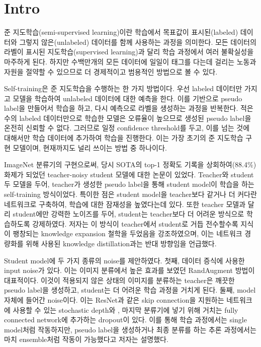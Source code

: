 \section{Intro}
준 지도학습(semi-supervised learning)이란 학습에서 목표값이 표시된(labeled) 데이터와 그렇지 않은(unlabeled) 데이터를 함께 사용하는 과정을 의미한다. 모든 데이터의 라벨이 표시된 지도학습(supervised learning)과 달리 학습 과정에서 여러 불확실성을 마주하게 된다. 하지만 수백만개의 모든 데이터에 일일이 태그를 다는데 걸리는 노동과 자원을 절약할 수 있으므로 더 경제적이고 범용적인 방법으로 볼 수 있다. \cite{zhu2006semisupervised}

Self-training은 준 지도학습을 수행하는 한 가지 방법이다. 우선 labeled 데이터만 가지고 모델을 학습하여 unlabeled 데이터에 대한 예측을 한다. 이를 기반으로 pseudo label을 만들어서 학습을 하고, 다시 예측으로 라벨을 생성하는 과정을 반복한다. 적은 수의 labeled 데이터만으로 학습한 모델은 오류율이 높으므로 생성된 pseudo label을 온전히 신뢰할 수 없다. 그러므로 일정 confidence threshold를 두고, 이를 넘는 것에 대해서만 학습 데이터에 추가하여 학습을 진행한다. 이는 가장 초기의 준 지도학습 구현 모델이며, 현재까지도 널리 쓰이는 방법 중 하나이다. \cite{zhu2006semisupervised}

ImageNet 분류기의 구현으로써, 당시 SOTA의 top-1 정확도 기록을 상회하여(88.4\%) 화제가 되었던 teacher-noisy student 모델에 대한 논문이 있었다. \cite{xie2020selftraining} Teacher와 student 두 모델을 두어, teacher가 생성한 pseudo label을 통해 student model이 학습을 하는 self-training 방식이었다. 특이한 점은 student model을 teacher보다 같거나 더 커다란 네트워크로 구축하여, 학습에 대한 잠재성을 높였다는데 있다. 또한 teacher 모델과 달리 student에만 강력한 노이즈를 두어, student는 teacher보다 더 어려운 방식으로 학습하도록 강제하였다. 저자는 이 방식이 teacher에서 student로 거듭 전수할수록 지식이 팽창되는 knowledge expansion 철학을 두었음을 강조하였으며, 이는 네트워크 경량화를 위해 사용된 knowledge distillation과는 \cite{hinton2015distilling} 반대 방향임을 언급했다.

Student model에 두 가지 종류의 noise를 제안하였다. 첫째, 데이터 증식에 사용한 input noise가 있다. 이는 이미지 분류에서 높은 효과를 보였던 RandAugment 방법이 \cite{cubuk2019randaugment} 대표적이다. 이것이 적용되지 않은 상태의 이미지를 분류하는 teacher은 깨끗한 pseudo label을 생성하고, student는 더 어려운 학습 과정을 거치게 된다. 둘째, model 자체에 들어간 noise이다. 이는 ResNet과 같은 skip connection을 지원하는 네트워크에 사용할 수 있는 stochastic depth와 \cite{huang2016deep}, 마지막 분류기에 넣기 위해 거치는 fully connected network에 추가하는 dropout이 있다. 이를 통해 학습 과정에서는 single model처럼 작동하지만, pseudo label을 생성하거나 최종 분류를 하는 추론 과정에서는 마치 ensemble처럼 작동이 가능했다고 저자는 설명했다. \cite{xie2020selftraining}

